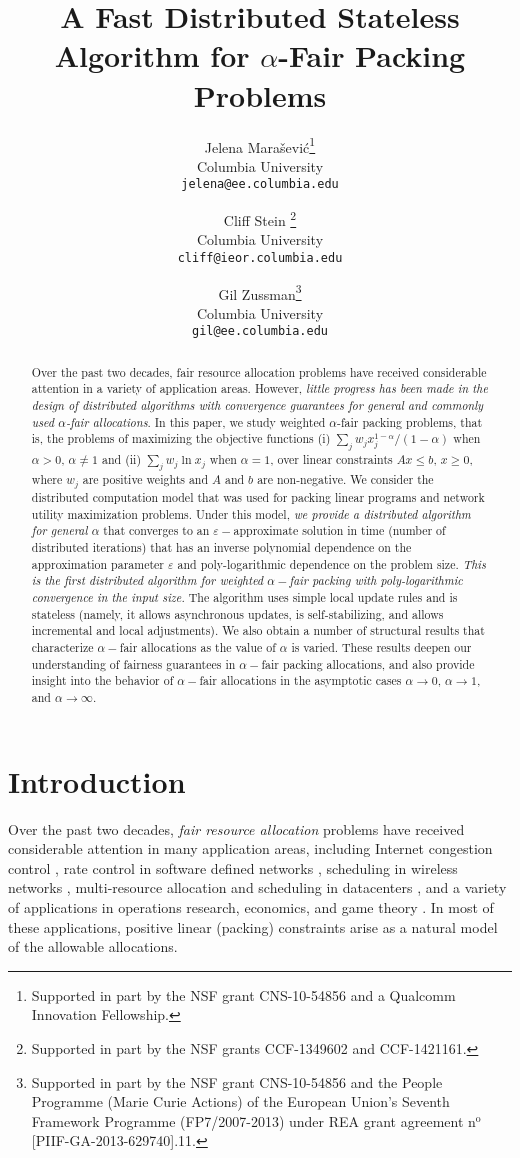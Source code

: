 \documentclass[11pt]{article}
\title{{A Fast Distributed Stateless Algorithm for $\alpha$-Fair Packing Problems}}
\author{
Jelena Mara\v{s}evi\'{c}\thanks{Supported in part by the NSF grant CNS-10-54856 and a Qualcomm Innovation Fellowship.}\\ 
Columbia University\\
{\tt jelena@ee.columbia.edu}\\
\and
Cliff Stein \thanks{Supported in part by the NSF grants CCF-1349602 and CCF-1421161.}\\
{Columbia University}\\
{\tt cliff@ieor.columbia.edu}\\
\and
Gil Zussman\thanks{Supported in part by the NSF grant CNS-10-54856 and the People Programme (Marie Curie Actions) of the European Union's Seventh Framework Programme (FP7/2007-2013) under REA grant agreement n${^{\text{o}}} $[PIIF-GA-2013-629740].11.}\\
{Columbia University}\\
{\tt gil@ee.columbia.edu}
}
\date{}
\begin{document}
\maketitle
\begin{abstract}
Over the past two decades, fair resource allocation problems have received considerable attention in a variety of application areas. However, \emph{little progress has been made in the design of distributed algorithms with convergence guarantees for general and commonly used $\alpha$-fair allocations}.  In this paper, we study weighted $\alpha$-fair packing problems, that is, the problems of maximizing the objective functions (i) $\sum_j w_j x_j^{1-\alpha}/(1-\alpha)$ when $\alpha > 0$, $\alpha \neq 1$ and (ii) $\sum_j w_j \ln x_j$ when $\alpha = 1$, over linear constraints $Ax \leq b$, $x\geq 0$, where $w_j$ are positive weights and $A$ and $b$ are non-negative. We consider the distributed computation model that was used for packing linear programs and network utility maximization problems. Under this model, \emph{we provide a distributed algorithm for general $\alpha$} that converges to an $\varepsilon-$approximate solution in time (number of distributed iterations) that has an inverse polynomial dependence on the approximation parameter $\varepsilon$ and poly-logarithmic dependence on the problem size. \emph{This is the first distributed algorithm for weighted $\alpha-$fair packing with poly-logarithmic convergence in the input size.} The algorithm uses simple local update rules and is stateless (namely,  it allows asynchronous updates, is self-stabilizing, and allows incremental and local adjustments). We also obtain a number of structural results that characterize $\alpha-$fair allocations as the value of $\alpha$ is varied. These results deepen our understanding of fairness guarantees in $\alpha-$fair packing allocations, and also provide insight into the behavior of $\alpha-$fair allocations in the asymptotic cases $\alpha\rightarrow 0$, $\alpha \rightarrow 1$, and $\alpha \rightarrow \infty$.  
\end{abstract}


\thispagestyle{empty}
\newpage



\section{Introduction}\label{section:intro}
\setcounter{page}{1}
\pagestyle{plain}

Over the past two decades, \emph{fair resource allocation} problems have received considerable attention in many  application areas, including  Internet congestion control \cite{low2002internet}, rate control in software defined networks \cite{mccormick2014real}, scheduling in wireless networks \cite{yi2008stochastic}, {multi-resource allocation and scheduling in datacenters} \cite{bonald2015multi, ghodsi2011dominant, joe2013multiresource, Im2014competitive}, and a variety of applications in operations research,  economics, and game theory
\cite{bertsimas2012efficiency, jain2007eisenberg}. In most of these applications, positive linear (packing) constraints arise as a natural model of the allowable allocations. 
\end{document}
